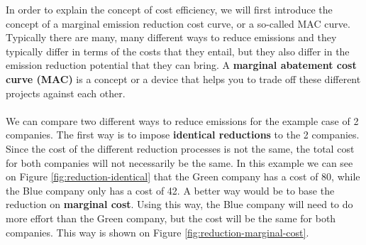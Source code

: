 \documentclass[../summary.tex]{subfiles}
\begin{document}
	  In order to explain the concept of cost efficiency, we will first introduce the concept of a marginal emission reduction cost curve, or a so-called MAC curve. Typically there are many, many different ways to reduce emissions and they typically differ in terms of the costs that they entail, but they also differ in the emission reduction potential that they can bring. A \textbf{marginal abatement cost curve (MAC)} is a concept or a device that helps you to trade off these different projects against each other.
	  \\\\
	  We can compare two different ways to reduce emissions for the example case of 2 companies. The first way is to impose \textbf{identical reductions} to the 2 companies. Since the cost of the different reduction processes is not the same, the total cost for both companies will not necessarily be the same. In this example we can see on Figure \ref{fig:reduction-identical} that the Green company has a cost of 80, while the Blue company only has a cost of 42. A better way would be to base the reduction on \textbf{marginal cost}. Using this way, the Blue company will need to do more effort than the Green company, but the cost will be the same for both companies. This way is shown on Figure \ref{fig:reduction-marginal-cost}.
	  
\end{document}
